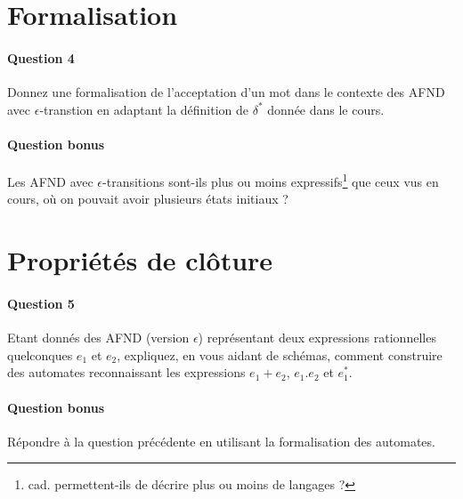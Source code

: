 \documentclass{article}[11pt]
\theoremstyle{definition}
\begin{document}
\section{Formalisation}

\paragraph*{Question 4} Donnez une formalisation de l'acceptation d'un mot dans le contexte des AFND avec $\epsilon$-transtion en adaptant la définition de $\delta^*$ donnée dans le cours.

\paragraph*{Question bonus} Les AFND avec $\epsilon$-transitions sont-ils plus ou moins expressifs\footnote{cad. permettent-ils de décrire plus ou moins de langages ?} que ceux vus en cours, où on pouvait avoir plusieurs états initiaux ?


\section{Propriétés de clôture}

\paragraph*{Question 5} Etant donnés des AFND (version $\epsilon$) représentant deux expressions rationnelles quelconques $e_1$ et $e_2$, expliquez, en vous aidant de schémas, comment construire des automates reconnaissant les expressions $e_1 + e_2$, $e_1.e_2$ et $e_1^*$.

\paragraph*{Question bonus} Répondre à la question précédente en utilisant la formalisation des automates.
\end{document}
